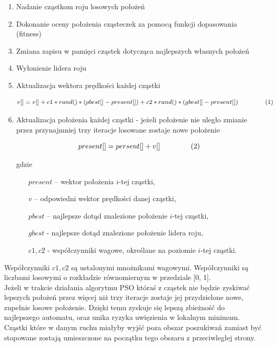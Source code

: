 \documentclass[runningheads,a4paper]{llncs}
\begin{document}
\begin{enumerate}
\item Nadanie cząstkom roju losowych położeń
\item Dokonanie oceny położenia cząsteczek za pomocą funkcji dopasowania (fitness)
\item Zmiana zapisu w pamięci cząstek dotycząca najlepszych własnych położeń
\item Wyłonienie lidera roju
\item Aktualizacja wektora prędkości każdej cząstki

\begin{displaymath}
v[] = v[] + c1 * rand() * (pbest[] - present[]) + c2 * rand() * (gbest[] - present[]) \hspace{15mm} (1)
\end{displaymath}

\item Aktualizacja położenia każdej cząstki - jeżeli położenie nie uległo zmianie przez przynajmniej trzy iteracje losowane zostaje nowe położenie

\begin{displaymath}
present[] = persent[] + v[] \hspace{15mm} (2)
\end{displaymath}

gdzie

\begin{itemize}
\item[$present$] -- wektor położenia $i$-tej cząstki,
\item[$v$] -- odpowiedni wektor prędkości danej cząstki,
\item[$pbest$] -- najlepsze dotąd znalezione położenie $i$-tej cząstki,
\item[$gbest$] - najlepsze dotąd znalezione położenie lidera roju,
\item[$c1, c2$] - współczynniki wagowe, określane na poziomie $i$-tej cząstki.
\end{itemize}
\end{enumerate}

Współczynniki $c1, c2$ są ustalonymi mnożnikami wagowymi. Współczynniki  są liczbami losowymi o rozkładzie równomiernym w przedziale [0, 1]. \\

Jeżeli w trakcie działania algorytmu PSO któraś z cząstek nie będzie zyskiwać lepszych położeń przez więcej niż trzy iteracje zostaje jej przydzielone nowe, zupełnie losowe położenie. Dzięki temu zyskuje się lepszą zbieżność do najlepszego automatu, oraz unika ryzyka uwięzienia w lokalnym minimum. Cząstki które w danym ruchu miałyby wyjść poza obszar poszukiwań zamiast być stopowane zostają umieszczone na początku tego obszaru z przeciwległej strony. \\
\end{document}
